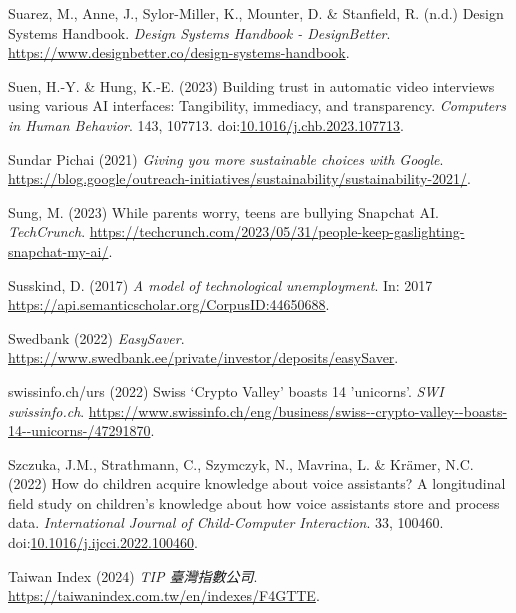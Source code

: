 \documentclass[
  letterpaper,
  DIV=11,
  numbers=noendperiod]{scrartcl}
\newlength{\cslhangindent}
\newenvironment{CSLReferences}[2] %
 {\begin{list}{}{%
  \setlength{\itemindent}{0pt}
  \setlength{\leftmargin}{0pt}
  \setlength{\parsep}{0pt}
  \ifodd #1
   \setlength{\leftmargin}{\cslhangindent}
   \setlength{\itemindent}{-1\cslhangindent}
  \fi
  \setlength{\itemsep}{#2\baselineskip}}}
 {\end{list}}
\begin{document}
\begin{CSLReferences}{0}{1}
Suarez, M., Anne, J., Sylor-Miller, K., Mounter, D. \& Stanfield, R.
(n.d.) Design {Systems Handbook}. \emph{Design Systems Handbook -
DesignBetter}.
\url{https://www.designbetter.co/design-systems-handbook}.

Suen, H.-Y. \& Hung, K.-E. (2023) Building trust in automatic video
interviews using various {AI} interfaces: {Tangibility}, immediacy, and
transparency. \emph{Computers in Human Behavior}. 143, 107713.
doi:\href{https://doi.org/10.1016/j.chb.2023.107713}{10.1016/j.chb.2023.107713}.

Sundar Pichai (2021) \emph{Giving you more sustainable choices with
{Google}}.
\url{https://blog.google/outreach-initiatives/sustainability/sustainability-2021/}.

Sung, M. (2023) While parents worry, teens are bullying {Snapchat AI}.
\emph{TechCrunch}.
\url{https://techcrunch.com/2023/05/31/people-keep-gaslighting-snapchat-my-ai/}.

Susskind, D. (2017) \emph{A model of technological unemployment}. In:
2017 \url{https://api.semanticscholar.org/CorpusID:44650688}.

Swedbank (2022) \emph{{EasySaver}}.
\url{https://www.swedbank.ee/private/investor/deposits/easySaver}.

swissinfo.ch/urs (2022) Swiss {`{Crypto Valley}'} boasts 14 'unicorns'.
\emph{SWI swissinfo.ch}.
\url{https://www.swissinfo.ch/eng/business/swiss--crypto-valley--boasts-14--unicorns-/47291870}.

Szczuka, J.M., Strathmann, C., Szymczyk, N., Mavrina, L. \& Krämer, N.C.
(2022) How do children acquire knowledge about voice assistants? {A}
longitudinal field study on children's knowledge about how voice
assistants store and process data. \emph{International Journal of
Child-Computer Interaction}. 33, 100460.
doi:\href{https://doi.org/10.1016/j.ijcci.2022.100460}{10.1016/j.ijcci.2022.100460}.

Taiwan Index (2024) \emph{{TIP} 臺灣指數公司}.
\url{https://taiwanindex.com.tw/en/indexes/F4GTTE}.


\end{CSLReferences}
\end{document}
